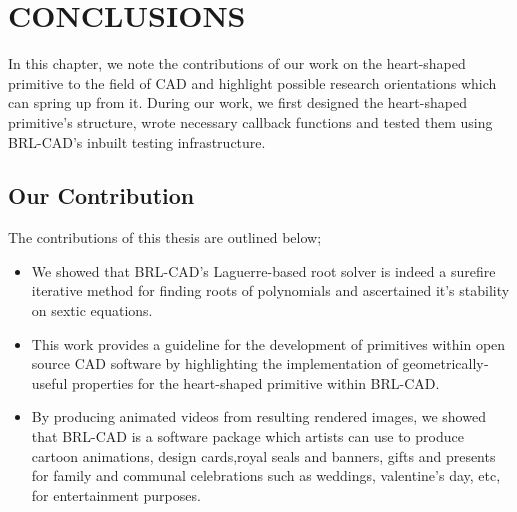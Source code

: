 \chapter{CONCLUSIONS}
\label{Conclusions}

In   this   chapter,   we   note   the   contributions   of   our   work   on  
the   heart-­shaped   primitive   to   the   field   of   CAD   and   highlight  
possible   research   orientations   which   can   spring   up   from   it.   During   our   work,   we  
first   designed   the   heart­-shaped   primitive's   structure,   wrote   necessary   callback  
functions and tested them using BRL-­CAD's inbuilt testing infrastructure. 


\section{Our Contribution}

The contributions of this thesis are outlined below;  

\begin{itemize}
\item We   showed   that   BRL-­CAD's   Laguerre-­based   root   solver   is   indeed   a  
sure­fire   iterative   method   for   finding   roots   of   polynomials   and   ascertained  
it's stability on sextic equations.  
\item This   work   provides   a   guideline   for   the   development   of   primitives   within  
open   source   CAD   software   by   highlighting   the  implementation   of   
geometrically­ useful properties for the heart-shaped primitive within BRL-­CAD.  
\item By   producing   animated   videos   from   resulting   rendered   images,   we  
showed   that   BRL­-CAD   is   a   software   package   which   artists   can   use   to  
produce   cartoon   animations,   design   cards,royal   seals   and   banners,   gifts  
and   presents   for   family   and   communal   celebrations   such   as   weddings,  
valentine's day, etc, for entertainment purposes.
\end{itemize}

